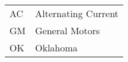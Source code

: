 \thispagestyle{empty}  %
\begin{longtable}{p{} p{}}
AC & Alternating Current \\
GM & General Motors \\
OK & Oklahoma \\
\end{longtable}
